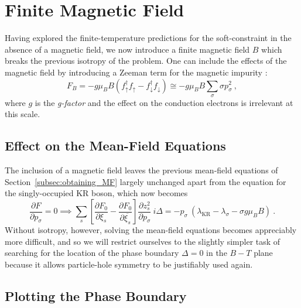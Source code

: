 
\section{Finite Magnetic Field}
\label{sec:finite_field}

Having explored the finite-temperature predictions for the soft-constraint in the absence of a magnetic field, we now introduce a finite magnetic field $ B $ which breaks the previous isotropy of the problem. One can include the effects of the magnetic field by introducing a Zeeman term for the magnetic impurity \cite{LargeN}: $$ F_{B} = - g \mu_{B} B \left( f^{\dagger}_{\uparrow} f^{}_{\uparrow} - f^{\dagger}_{\downarrow} f^{}_{\downarrow} \right) \cong - g \mu_{B} B \sum_{\sigma} \sigma p^2_{\sigma} ~ , $$ where $ g $ is the \textit{g-factor} and the effect on the conduction electrons is irrelevant at this scale.

\subsection{Effect on the Mean-Field Equations}

The inclusion of a magnetic field leaves the previous mean-field equations of Section~\ref{subsec:obtaining_MF} largely unchanged apart from the equation for the singly-occupied KR boson, which now becomes
\begin{equation}
\frac{\partial F}{\partial p_{\sigma}} = 0 \implies \sum_{s} \left[ \frac{\partial F_{0}}{\partial \xi_{s}} - \frac{\partial F_{0}}{\partial \overline{\xi_{s}}} \right] \frac{\partial z^2_{s}}{\partial p_{\sigma}} ~ i \Delta = - p_{\sigma} ~ (\lambda_{\text{KR}} - \lambda_{\sigma} - \sigma g \mu_{B} B) ~ .
\end{equation}
Without isotropy, however, solving the mean-field equations becomes appreciably more difficult, and so we will restrict ourselves to the slightly simpler task of searching for the location of the phase boundary $ \Delta = 0 $ in the $ B-T $ plane because it allows particle-hole symmetry to be justifiably used again.

\subsection{Plotting the Phase Boundary}

